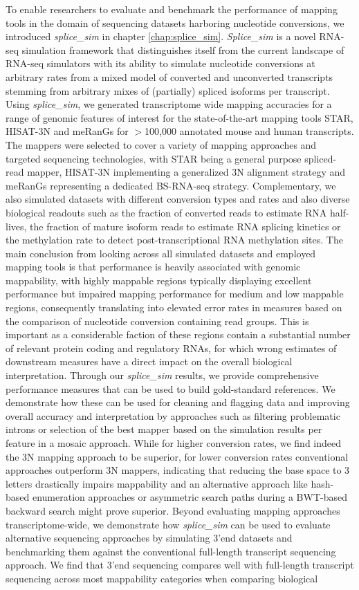 To enable researchers to evaluate and benchmark the performance of mapping tools in the domain of sequencing datasets harboring nucleotide conversions, we introduced \textit{splice\_sim} in chapter \ref{chap:splice_sim}. \textit{Splice\_sim} is a novel RNA-seq simulation framework that distinguishes itself from the current landscape of RNA-seq simulators with its ability to simulate nucleotide conversions at arbitrary rates from a mixed model of converted and unconverted transcripts stemming from arbitrary mixes of (partially) spliced isoforms per transcript. Using \textit{splice\_sim}, we generated transcriptome wide mapping accuracies for a range of genomic features of interest for the state-of-the-art mapping tools STAR, HISAT-3N and meRanGs for $>$100,000 annotated mouse and human transcripts. The mappers were selected to cover a variety of mapping approaches and targeted sequencing technologies, with STAR being a general purpose spliced-read mapper, HISAT-3N implementing a generalized 3N alignment strategy and meRanGs representing a dedicated BS-RNA-seq strategy. Complementary, we also simulated datasets with different conversion types and rates and also diverse biological readouts such as the fraction of converted reads to estimate RNA half-lives, the fraction of mature isoform reads to estimate RNA splicing kinetics or the methylation rate to detect post-transcriptional RNA methylation sites. The main conclusion from looking across all simulated datasets and employed mapping tools is that performance is heavily associated with genomic mappability, with highly mappable regions typically displaying excellent performance but impaired mapping performance for medium and low mappable regions, consequently translating into elevated error rates in measures based on the comparison of nucleotide conversion containing read groups. This is important as a considerable faction of these regions contain a substantial number of relevant protein coding and regulatory RNAs, for which wrong estimates of downstream measures have a direct impact on the overall biological interpretation. Through our \textit{splice\_sim} results, we provide comprehensive performance measures that can be used to build gold-standard references. We demonstrate how these can be used for cleaning and flagging data and improving overall accuracy and interpretation by approaches such as filtering problematic introns or selection of the best mapper based on the simulation results per feature in a mosaic approach. While for higher conversion rates, we find indeed the 3N mapping approach to be superior, for lower conversion rates conventional approaches outperform 3N mappers, indicating that reducing the base space to 3 letters drastically impairs mappability and an alternative approach like hash-based enumeration approaches or asymmetric search paths during a BWT-based backward search might prove superior. Beyond evaluating mapping approaches transcriptome-wide, we demonstrate how \textit{splice\_sim} can be used to evaluate alternative sequencing approaches by simulating 3'end datasets and benchmarking them against the conventional full-length transcript sequencing approach. We find that 3'end sequencing compares well with full-length transcript sequencing across most mappability categories when comparing biological 